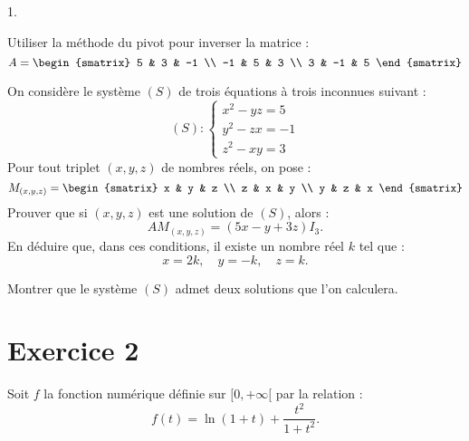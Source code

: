 \documentclass[11pt]{article}%
\begin{document}
\begin{noliste}{1.}
 \setlength{\itemsep}{4mm}
\item Utiliser la méthode du pivot pour inverser la matrice : 
\[
A = 
\begin{smatrix}
5 & 3 & -1 \\
-1 & 5 & 3 \\
3 & -1 & 5
\end{smatrix}
\]

\item On considère le système $(S)$ de trois équations à trois
inconnues
suivant : 
\[
(S) :\left\{
\begin{array}{cl}
x^{2}-yz = 5 \\
y^{2}-zx = -1 \\
z^{2}-xy = 3
\end{array}
\right.
\]
Pour tout triplet $(x,y,z)$ de nombres réels, on pose : 
\[
M_{(x,y,z)} = 
\begin{smatrix}
x & y & z \\
z & x & y \\
y & z & x
\end{smatrix}
\]
Prouver que si $(x,y,z)$ est une solution de $(S)$, alors : 
\[
AM_{(x,y,z)} = (5x-y + 3z)I_{3}.
\]
En déduire que, dans ces conditions, il existe un nombre réel $k$ tel
que : 
\[
x = 2k,\quad y = -k,\quad z = k.
\]

\item Montrer que le système $(S)$ admet deux solutions que l'on
calculera.
\end{noliste}

\section*{Exercice 2}

Soit $f$ la fonction numérique définie sur $[0, + \infty \lbrack $ par
la
relation : 
\[
f(t) = \ln (1 + t) + \frac{t^{2}}{1 + t^{2}}.
\]
\end{document}
